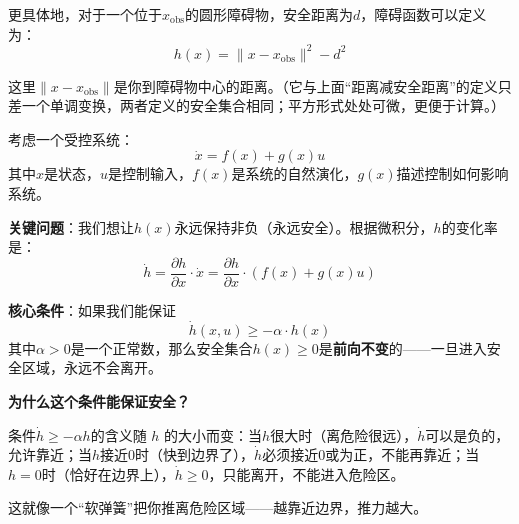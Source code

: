 更具体地，对于一个位于$x_{\text{obs}}$的圆形障碍物，安全距离为$d$，障碍函数可以定义为：
\begin{equation}
    h(x) = \|x - x_{\text{obs}}\|^2 - d^2
\end{equation}

这里$\|x - x_{\text{obs}}\|$是你到障碍物中心的距离。（它与上面“距离减安全距离”的定义只差一个单调变换，两者定义的安全集合相同；平方形式处处可微，更便于计算。）

\begin{theorem}
\label{thm:cbf}
考虑一个受控系统：
\begin{equation}
    \dot{x} = f(x) + g(x)u
\end{equation}
其中$x$是状态，$u$是控制输入，$f(x)$是系统的自然演化，$g(x)$描述控制如何影响系统。

\textbf{关键问题}：我们想让$h(x)$永远保持非负（永远安全）。根据微积分，$h$的变化率是：
\begin{equation}
    \dot{h} = \frac{\partial h}{\partial x} \cdot \dot{x} = \frac{\partial h}{\partial x} \cdot (f(x) + g(x)u)
\end{equation}

\textbf{核心条件}：如果我们能保证
\begin{equation}
    \boxed{\dot{h}(x, u) \geq -\alpha \cdot h(x)}
\end{equation}
其中$\alpha > 0$是一个正常数，那么安全集合$h(x) \geq 0$是\textbf{前向不变}的——一旦进入安全区域，永远不会离开。
\end{theorem}

\begin{physicalintuition}
\textbf{为什么这个条件能保证安全？}

条件$\dot{h} \geq -\alpha h$的含义随 $h$ 的大小而变：当$h$很大时（离危险很远），$\dot{h}$可以是负的，允许靠近；当$h$接近0时（快到边界了），$\dot{h}$必须接近0或为正，不能再靠近；当$h = 0$时（恰好在边界上），$\dot{h} \geq 0$，只能离开，不能进入危险区。

这就像一个“软弹簧”把你推离危险区域——越靠近边界，推力越大。
\end{physicalintuition}

